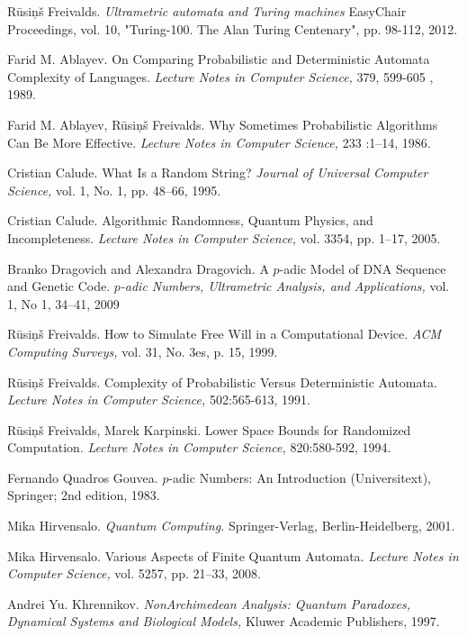 \documentclass{llncs}
\begin{document}
\begin{thebibliography}{99}

R\= usi\c n\v s Freivalds.
{\em Ultrametric automata and Turing machines}
EasyChair Proceedings, vol. 10, "Turing-100. The Alan Turing Centenary", pp. 98-112, 2012.


Farid M. Ablayev. 
On Comparing Probabilistic and Deterministic Automata Complexity of Languages. 
{\em Lecture Notes in Computer Science,} 379, 599-605  , 1989.

Farid M. Ablayev, R\= usi\c n\v s Freivalds. 
Why Sometimes Probabilistic Algorithms Can Be More Effective. 
{\em Lecture Notes in Computer Science,} 233 :1--14, 1986.


Cristian Calude.
What Is a Random String?
{\em Journal of Universal Computer Science,} vol. 1, No. 1, pp. 48--66, 1995.

Cristian Calude.
Algorithmic Randomness, Quantum Physics, and Incompleteness.
{\em Lecture Notes in Computer Science,} vol. 3354, pp. 1--17, 2005.


Branko Dragovich and Alexandra Dragovich.
A $p$-adic Model
of DNA Sequence and Genetic Code.
{\em $p$-adic Numbers, Ultrametric Analysis, and Applications,}
vol. 1, No 1, 34--41, 2009

R\= usi\c n\v s Freivalds.
How to Simulate Free Will in a Computational Device. 
{\em ACM Computing Surveys,} vol. 31, No. 3es, p. 15, 1999.


R\= usi\c n\v s Freivalds.
Complexity of Probabilistic Versus Deterministic Automata. 
{\em Lecture Notes in Computer Science,} 502:565-613, 1991. 

R\= usi\c n\v s Freivalds, Marek Karpinski. 
Lower Space Bounds for Randomized Computation. 
{\em Lecture Notes in Computer Science,} 820:580-592, 1994. 




Fernando Quadros Gouvea.
$p$-adic Numbers: An Introduction (Universitext),
Springer; 2nd edition, 1983.


Mika Hirvensalo.
{\em Quantum Computing.} Springer-Verlag, Berlin-Heidelberg,  2001.

Mika Hirvensalo.
Various Aspects of Finite Quantum Automata. 
{\em Lecture Notes in Computer Science,} vol. 5257, pp. 21--33, 2008. 


Andrei Yu. Khrennikov.
{\em NonArchimedean Analysis: Quantum Paradoxes, Dynamical Systems and
Biological Models,} Kluwer Academic Publishers, 1997.


\end{thebibliography}
\end{document}
